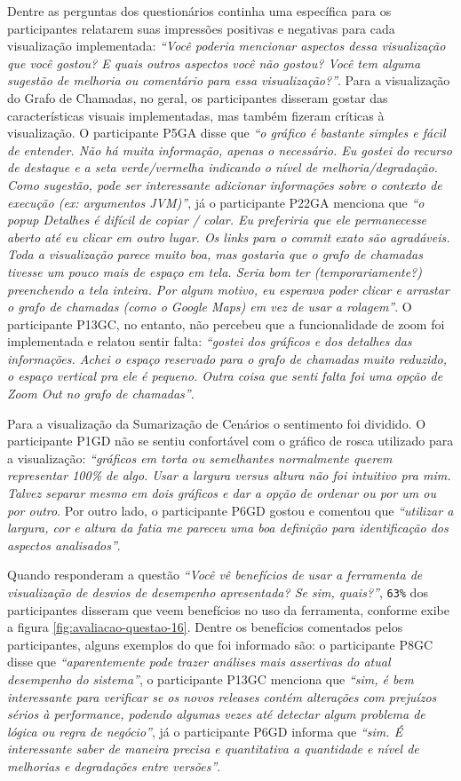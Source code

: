Dentre as perguntas dos questionários continha uma específica para os participantes relatarem suas impressões positivas e negativas para cada visualização implementada: \textit{``Você poderia mencionar aspectos dessa visualização que você gostou? E quais outros aspectos você não gostou? Você tem alguma sugestão de melhoria ou comentário para essa visualização?''}. Para a visualização do Grafo de Chamadas, no geral, os participantes disseram gostar das características visuais implementadas, mas também fizeram críticas à visualização. O participante P5GA disse que \textit{``o gráfico é bastante simples e fácil de entender. Não há muita informação, apenas o necessário. Eu gostei do recurso de destaque e a seta verde/vermelha indicando o nível de melhoria/degradação. Como sugestão, pode ser interessante adicionar informações sobre o contexto de execução (ex: argumentos JVM)''}, já o participante P22GA menciona que \textit{``o popup Detalhes é difícil de copiar / colar. Eu preferiria que ele permanecesse aberto até eu clicar em outro lugar. Os links para o commit exato são agradáveis. Toda a visualização parece muito boa, mas gostaria que o grafo de chamadas tivesse um pouco mais de espaço em tela. Seria bom ter (temporariamente?) preenchendo a tela inteira. Por algum motivo, eu esperava poder clicar e arrastar o grafo de chamadas (como o Google Maps) em vez de usar a rolagem''}. O participante P13GC, no entanto, não percebeu que a funcionalidade de zoom foi implementada e relatou sentir falta: \textit{``gostei dos gráficos e dos detalhes das informações. Achei o espaço reservado para o grafo de chamadas muito reduzido, o espaço vertical pra ele é pequeno. Outra coisa que senti falta foi uma opção de Zoom Out no grafo de chamadas''}.

Para a visualização da Sumarização de Cenários o sentimento foi dividido. O participante P1GD não se sentiu confortável com o gráfico de rosca utilizado para a visualização: \textit{``gráficos em torta ou semelhantes normalmente querem representar 100\% de algo. Usar a largura versus altura não foi intuitivo pra mim. Talvez separar mesmo em dois gráficos e dar a opção de ordenar ou por um ou por outro}. Por outro lado, o participante P6GD gostou e comentou que \textit{``utilizar a largura, cor e altura da fatia me pareceu uma boa definição para identificação dos aspectos analisados''}.

Quando responderam a questão \textit{``Você vê benefícios de usar a ferramenta de visualização de desvios de desempenho apresentada? Se sim, quais?''}, \texttt{63\%} dos participantes disseram que veem benefícios no uso da ferramenta, conforme exibe a figura \ref{fig:avaliacao-questao-16}. Dentre os benefícios comentados pelos participantes, alguns exemplos do que foi informado são: o participante P8GC disse que \textit{``aparentemente pode trazer análises mais assertivas do atual desempenho do sistema''}, o participante P13GC menciona que \textit{``sim, é bem interessante para verificar se os novos releases contém alterações com prejuízos sérios à performance, podendo algumas vezes até detectar algum problema de lógica ou regra de negócio''}, já o participante P6GD informa que \textit{``sim. É interessante saber de maneira precisa e quantitativa a quantidade e nível de melhorias e degradações entre versões''}.

